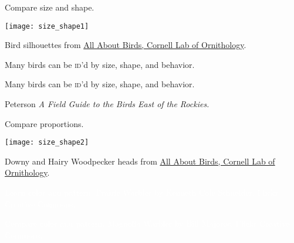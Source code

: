 \documentclass[t]{beamer}
\begin{document}
\begin{frame}[b,plain]{Compare size and shape.}
	\begin{center}
		\texttt{[image: size\_shape1]}
	\end{center}
	\tiny Bird silhouettes from \href{http://allaboutbirds.com}{All About Birds, Cornell Lab of Ornithology}.
\end{frame}


{
\begin{frame}[t,plain]{Many birds can be \textsc{id}'d by size, shape, and behavior.}

	\vfilll
	
	\tiny\hfill{}
\end{frame}
}

{
\begin{frame}[t,plain]{Many birds can be \textsc{id}'d by size, shape, and behavior.}

	\vfilll
	
	\tiny\hfill{Peterson \textit{A Field Guide to the Birds East of the Rockies.}}
\end{frame}
}

\begin{frame}[b,plain]{Compare proportions.}
	\begin{center}
		\texttt{[image: size\_shape2]}
	\end{center}
	\tiny Downy and Hairy Woodpecker heads from \href{http://allaboutbirds.com}{All About Birds, Cornell Lab of Ornithology}.
\end{frame}


{
\begin{frame}[b,plain]{\hfill\textcolor{white}{Learn color and pattern.}}
	\tiny\textcolor{white}{Prairie Warbler by Kenneth Cole Schneider, Flickr Creative Commons.}
\end{frame}
}

{
\begin{frame}[b,plain]{\hfill\textcolor{white}{Compare color and pattern.}}
	\tiny\textcolor{white}{Magnolia Warbler by Bill Majoros, Flickr Creative Commons.}
\end{frame}
}
\end{document}
